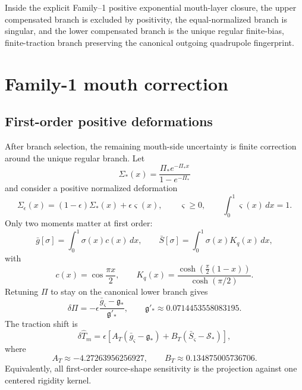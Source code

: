 \begin{theorem}
\label{thm:app-part04-unique-regular-mouth-branch}
Inside the explicit Family--1 positive exponential mouth-layer closure, the upper compensated branch is excluded by positivity, the equal-normalized branch is singular, and the lower compensated branch is the unique regular finite-bias, finite-traction branch preserving the canonical outgoing quadrupole fingerprint.
\end{theorem}

\section{Family-1 mouth correction}
\label{sec:app-part04_geometry_retarded_mouth:family-1-mouth-correction}

\subsection{First-order positive deformations}
\label{subsec:app-part04-positive-deformations}

After branch selection, the remaining mouth-side uncertainty is finite correction around the unique regular branch.  Let
\begin{equation}
\Sigma_*(x)=\frac{\Pi_*e^{-\Pi_*x}}{1-e^{-\Pi_*}}
\end{equation}
and consider a positive normalized deformation
\begin{equation}
\label{eq:app-part04-positive-deformation-family}
\Sigma_\epsilon(x)=(1-\epsilon)\Sigma_*(x)+\epsilon\varsigma(x),
\qquad
\varsigma\ge0,
\qquad
\int_0^1\varsigma(x)\,dx=1.
\end{equation}
Only two moments matter at first order:
\begin{equation}
\label{eq:app-part04-gbar-Sbar}
\bar g[\sigma]=\int_0^1\sigma(x)c(x)\,dx,
\qquad
\bar S[\sigma]=\int_0^1\sigma(x)K_q(x)\,dx,
\end{equation}
with
\begin{equation}
\label{eq:app-part04-c-Kq}
c(x)=\cos\frac{\pi x}{2},
\qquad
K_q(x)=\frac{\cosh\left(\frac{\pi}{2}(1-x)\right)}{\cosh(\pi/2)}.
\end{equation}
Retuning \(\Pi\) to stay on the canonical lower branch gives
\begin{equation}
\label{eq:app-part04-deltaPi-firstorder}
\delta\Pi
=-\epsilon\frac{\bar g_\varsigma-\mathfrak g_*}{\mathfrak g'_*},
\qquad
\mathfrak g'_*\approx0.0714453558083195.
\end{equation}
The traction shift is
\begin{equation}
\label{eq:app-part04-deltaT-firstorder}
\delta\widehat T_m
=
\epsilon\left[
A_T(\bar g_\varsigma-\mathfrak g_*)
+B_T(\bar S_\varsigma-\mathcal S_*)
\right],
\end{equation}
where
\begin{equation}
\label{eq:app-part04-AT-BT-values}
A_T\approx-4.27263956256927,
\qquad
B_T\approx0.134875005736706.
\end{equation}
Equivalently, all first-order source-shape sensitivity is the projection against one centered rigidity kernel.

